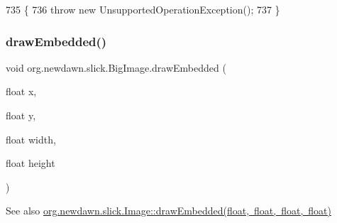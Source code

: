 \begin{DoxyCode}
735                                                \{
736         \textcolor{keywordflow}{throw} \textcolor{keyword}{new} UnsupportedOperationException();
737     \}
\end{DoxyCode}
\mbox{\label{classorg_1_1newdawn_1_1slick_1_1_big_image_a0d38fe005990974b0d166d834fc4b318}} 
\subsubsection{\texorpdfstring{draw\+Embedded()}{drawEmbedded()}\hspace{0.1cm}{\footnotesize\ttfamily [1/3]}}
{\footnotesize\ttfamily void org.\+newdawn.\+slick.\+Big\+Image.\+draw\+Embedded (\begin{DoxyParamCaption}\item[{float}]{x,  }\item[{float}]{y,  }\item[{float}]{width,  }\item[{float}]{height }\end{DoxyParamCaption})\hspace{0.3cm}{\ttfamily [inline]}}

\begin{DoxySeeAlso}{See also}
\mbox{\hyperlink{classorg_1_1newdawn_1_1slick_1_1_image_a5a8910fb31d9350d0c70fe7717172034}{org.\+newdawn.\+slick.\+Image\+::draw\+Embedded(float, float, float, float)}} 
\end{DoxySeeAlso}


